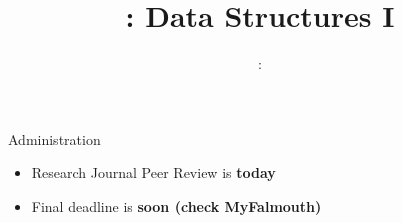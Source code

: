 \usepackage{../../beamerthemeFalmouthGamesAcademy}
\usepackage{multimedia}
\graphicspath{ {../../} }

\lstset{language=[Sharp]C
}

\usepackage[normalem]{ulem}
\usepackage{wasysym}

\usepackage{algpseudocode}

\usepackage{pdfpages}
\usepackage{qtree}

\usetikzlibrary{arrows,automata}
\usetikzlibrary{tikzmark,calc}




\title{\sessionnumber: Data Structures I}
\subtitle{\modulecode: \moduletitle}

\frame{\titlepage} 


\begin{frame}{Administration}
    \begin{itemize}
        \pause\item Research Journal Peer Review is \textbf{today}
        \pause\item Final deadline is \textbf{soon (check MyFalmouth)}
    \end{itemize}
\end{frame}






